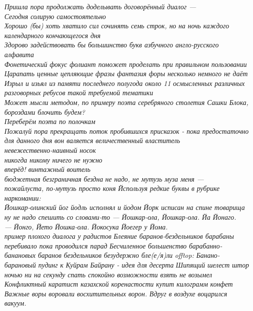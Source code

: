 \begin{flushleft}
    \emph{Пришла пора продолжать доделывать договорённый диалог ---\\
        Сегодня солирую самостоятельно\\
        Хорошо (бы) хоть хватило сил сочинять семь строк, но на ночь каждого календарного кончающегося дня\\
        Здорово задействовать бы большинство букв азбучного англо-русского алфавита\\
        Фонетический фокус фолиант поможет проделать при правильном пользовании\\
        Царапать ценные цепляющие фразы фантазия форы несколько немного не даёт\\
        Изрыл и изьял из памяти последнего полугода около 11 осмысленных различных разговорных ребусов такой требуемой тематики\\
        Может мысли методом, по примеру поэта серебряного столетия Сашки Блока, бороздами блочить будем?\\
        Переберём поэта по полочкам\\
        Пожалуй пора прекращать поток пробившихся присказок - пока предостаточно для данного дня}
    \emph{вон валяется величественный властитель\\
        невежественно-наивный носок\\
        никогда никому ничего не нужно\\
        вперёд! винтажный воитель\\
        бюджетная безграничная бездна}
    \emph{не надо, не мутузь муза меня ---\\
        пожайлуста, по-мутузь просто коня}
    \emph{Йспользуя редкие буквы в рубрике наркомании:\\
    Йошкар-олинский йог йодль исполнял и йодом Йорк исписан на спине товарища}
    \emph{ну не надо спешить со словами-то}
    \emph{--- Йошкар-ола, Йошкар-ола. Йа Йонаго.\\
        --- Йонго, Йето Йошка-ола. Йокосука Йоегер у Йома.\\
        пример плохого диалога у радистов}
    \emph{Блеяние баранов-бездельников барабаны перебивало пока проводился парад}
    \emph{Бесчиленное большенство барабанно-банановых баранов бездельников безудержно бле(е/я)ли}
    \emph{offtop: Банано-барановый пудинг к Куйрам Байрану - идея для десерта}
    \emph{Шипящий шелест штор ночью ни на секунду спать спокойно возможности взять не возымел}
    \emph{Конфликтный каратист казахской коренастости купит килограмм конфет}
    \emph{Важные воры воровали восхитительных ворон. Вдруг в воздухе воцарился вакуум.
}
\end{flushleft}
